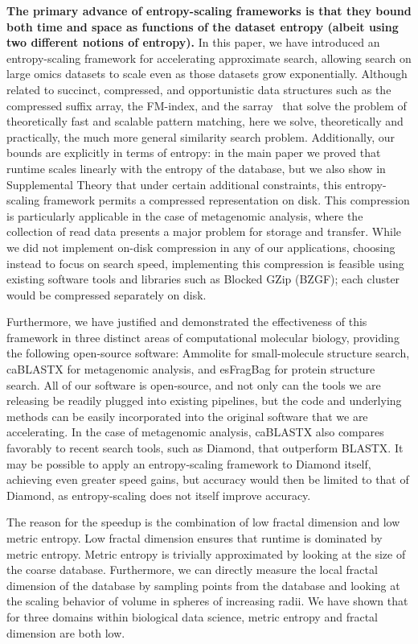 \documentclass[review,preprint,12pt]{elsarticle}
\renewcommand{\cite}{\citep} %
\theoremstyle{definition}
\theoremstyle{remark}
\numberwithin{equation}{section}
\begin{document}
\textbf{The primary advance of entropy-scaling frameworks is that they bound both time and space as functions of the dataset entropy (albeit using two different notions of entropy).}
In this paper, we have introduced an entropy-scaling framework for accelerating approximate search,
allowing search on large omics datasets to scale even as those datasets grow exponentially.
Although related to succinct, compressed, and opportunistic data structures such as the compressed suffix array, the FM-index, and the sarray~\cite{grossi2005compressed, ferragina2000opportunistic,conway2011succinct} that solve the problem of 
theoretically fast and scalable pattern matching,
here we solve, theoretically and practically, the much more general similarity 
search problem.
Additionally, our bounds are explicitly in terms of entropy: in the main paper we proved that runtime scales linearly with the entropy of the 
database, but we also show in Supplemental Theory that under certain additional constraints, this entropy-scaling framework permits a compressed 
representation on disk.
This compression is particularly applicable in the case of metagenomic analysis, where the collection of 
read data presents a major problem for storage and transfer.
While we did not implement on-disk compression in any of our applications, 
choosing instead to focus on search speed, implementing this compression is 
feasible using existing software tools and libraries such as Blocked GZip 
(BZGF); each cluster would be compressed separately on disk.

Furthermore, we have justified and demonstrated the effectiveness of this 
framework in
three distinct areas of computational molecular biology, providing the
following open-source software: Ammolite for
small-molecule structure search, caBLASTX for metagenomic analysis, and esFragBag for protein structure search.
All of our software is open-source, and not only can the tools we are 
releasing be readily plugged into existing pipelines, but the code and 
underlying methods can be easily incorporated into the original 
software that we are accelerating.
In the case of metagenomic analysis, caBLASTX also compares favorably to recent 
search tools, such as Diamond, that outperform BLASTX.
It may be possible to apply an entropy-scaling framework to Diamond itself, 
achieving even greater speed gains, but
accuracy would then be limited to that of Diamond,
as entropy-scaling does not itself 
improve accuracy.

The reason for the speedup is the combination of low fractal dimension and low metric entropy.
Low fractal dimension ensures that runtime is dominated by metric entropy.
Metric entropy is trivially approximated by looking at the size of the coarse database.
Furthermore, we can directly measure the local fractal dimension of the database by sampling points from the database and looking at the scaling behavior of volume in spheres of increasing radii.
We have shown that for three domains within biological data science, metric entropy and fractal dimension are both low.
\end{document}
